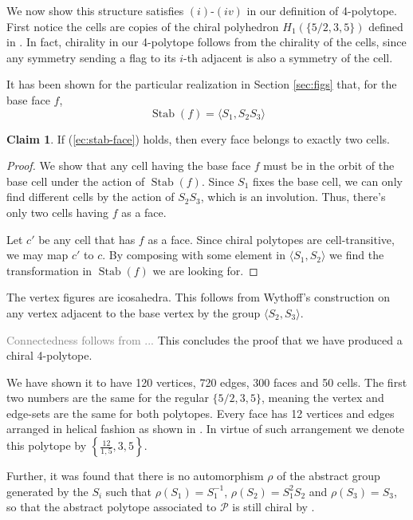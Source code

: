 \documentclass[spanish]{article}
\theoremstyle{definition}
\newtheorem*{claim}{Claim}
\newcommand{\p}{\mathcal{P}}
\DeclareMathOperator{\Stab}{Stab}
\begin{document}
	We now show this structure satisfies $(i)$-$(iv)$ in our definition of 4-polytope. First notice the cells are copies of the chiral polyhedron $H_1(\{5/2,3,5\})$ defined in \cite{petcox}. In fact, chirality in our 4-polytope follows from the chirality of the cells, since any symmetry sending a flag to its $i$-th adjacent is also a symmetry of the cell.
	
	It has been shown for the particular realization in Section \ref{sec:figs} that, for the base face $f$,
	\begin{equation}\label{ec:stab-face}
		\Stab(f)=\langle S_1,S_2S_3\rangle
	\end{equation}
	\begin{claim}
		If (\ref{ec:stab-face}) holds, then every face belongs to exactly two cells.
	\end{claim}
	\begin{proof}
		We show that any cell having the base face $f$ must be in the orbit of the base cell under the action of $\Stab(f)$. Since $S_1$ fixes the base cell, we can only find different cells by the action of $S_2S_3$, which is an involution. Thus, there's only two cells having $f$ as a face.
		
		Let $c'$ be any cell that has $f$ as a face. Since chiral polytopes are cell-transitive, we may map $c'$ to $c$. By composing with some element in $\langle S_1,S_2\rangle$ we find the transformation in $\Stab(f)$ we are looking for.
	\end{proof}
	
	The vertex figures are icosahedra. This follows from Wythoff's construction on any vertex adjacent to the base vertex by the group $\langle S_2,S_3\rangle$.
	
	\textcolor{gray}{Connectedness follows from ...} This concludes the proof that we have produced a chiral 4-polytope.
	
	We have shown it to have  120 vertices, 720 edges, 300 faces and 50 cells. The first two numbers are the same for the regular $\{5/2,3,5\}$, meaning the vertex and edge-sets are the same for both polytopes. Every face has 12 vertices and edges arranged in helical fashion as shown in \cite{petcox}. In virtue of such arrangement we denote this polytope by $\left\{\frac{12}{1,5},3,5\right\}$.
	
	Further, it was found that there is no automorphism $\rho$ of the abstract group generated by the $S_i$ such that $\rho(S_1)=S_1^{-1}$, $\rho(S_2)=S_1^2S_2$ and $\rho(S_3)=S_3$, so that the abstract polytope associated to $\p$ is still chiral by \cite{schulte-chiral}.
	
\end{document}

